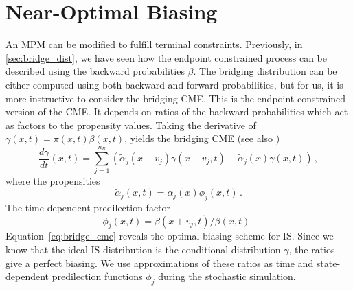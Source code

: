 \section{Near-Optimal Biasing}
An \ac{MPM} can be modified to fulfill terminal constraints.
Previously, in \autoref{sec:bridge_dist}, we have seen how the endpoint constrained process can be described using the backward probabilities $\beta$.
The bridging distribution can be either computed using both backward and forward probabilities, but for us, it is more instructive to consider the bridging \ac{CME}.
This is the endpoint constrained version of the \ac{CME}.
It depends on ratios of the backward probabilities which act as factors to the propensity values.
Taking the derivative of $\gamma(x,t)=\pi(x,t)\beta(x,t)$, yields the bridging \ac{CME} (see also \citet{huang2016reconstructing})
\begin{equation}\label{eq:bridge_cme}
    \frac{d\gamma}{d t} ( x,t) =
    \sum_{j=1}^{n_R}\left(
        \tilde{\alpha}_j( x- v_j)\gamma( x- v_j,t) - \tilde{\alpha}_j( x)\gamma( x,t)
    \right)\,,
\end{equation}
where the propensities
\begin{equation}
    \tilde{\alpha}_j(x, t) = \alpha_j(x)\phi_j(x, t)\,.
\end{equation}
The time-dependent predilection factor
\begin{equation}\label{eq:dyn_predilection}
    \phi_j(x, t) = {\beta(x + v_j, t)}/{\beta(x, t)}\,.
\end{equation}
Equation~\eqref{eq:bridge_cme} reveals the optimal biasing scheme for \ac{IS}.
Since we know that the ideal \ac{IS} distribution is the conditional distribution $\gamma$, the ratios
give a perfect biasing.
We use approximations of these ratios as time and state-dependent predilection functions $\phi_j$ during the stochastic simulation.

